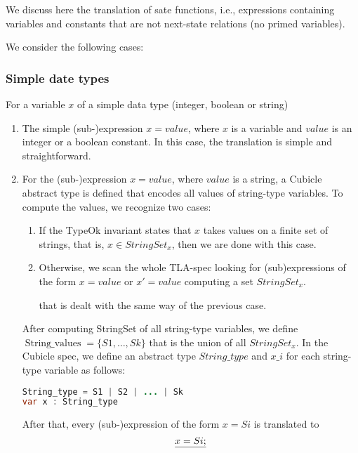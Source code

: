 \documentclass{article}
\theoremstyle{plain}
\numberwithin{equation}{section}
\begin{document}
We discuss here the translation of sate functions, i.e., expressions containing variables and constants that are not  next-state relations (no primed variables).

We consider the following cases: 

\subsubsection{Simple date types} \label{SimType}

 For a variable $x$ of a simple data type (integer, boolean or string) 
\begin{enumerate} 

\item The simple (sub-)expression \emph{$x=value$}, where $x$ is a variable and  \emph{$value$} is an integer or a boolean constant. In this case, the translation is simple and straightforward.  

\item  For  the (sub-)expression \emph{$x=value$}, where \emph{$value$} is a string, a Cubicle abstract type  is defined that encodes all values of string-type variables. To compute the values, we recognize two cases: 
\begin{enumerate}
\item If the TypeOk invariant states that  $x$ takes values on a finite set of strings, that is, \emph{$x \in StringSet_x$}, then we are done with this case.



\item Otherwise, we scan the whole TLA-spec looking for (sub)expressions of the form \emph{$x=value$} or \emph{$x'=value$} computing a set \emph{$StringSet_x$}.

 that is dealt with the same way of the previous case. 
  \end{enumerate}


After computing StringSet of all string-type variables, we define $\operatorname{String\_values}=\{S1,\dots, Sk\}$ that is the union of all \emph{$StringSet_x$}. In the Cubicle spec, we define an abstract type \emph{$String\_type$} and \emph{$x\_i$} for each string-type variable as follows: 

\begin{lstlisting}[language=Java]
String_type = S1 | S2 | ... | Sk
var x : String_type

\end{lstlisting}
After that, every (sub-)expression of the form \emph{$x=Si$} is translated to 
$$\emph{x= Si;}$$ 


\end{enumerate}
\end{document}
